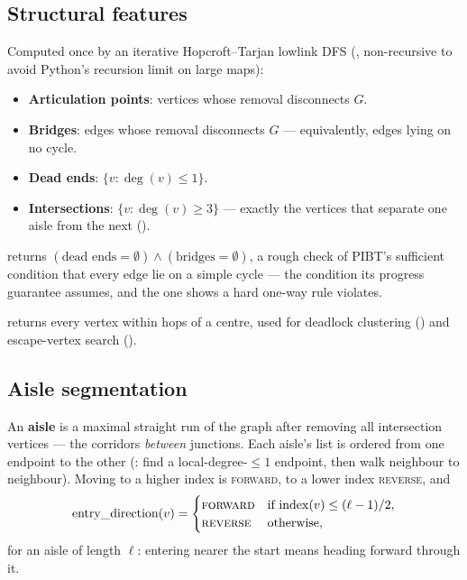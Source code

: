 \subsection{Structural features}
\label{sec:graph-structure}

Computed once by an iterative Hopcroft--Tarjan lowlink DFS
(, non-recursive to avoid Python's
recursion limit on large maps):

\begin{itemize}
\item \textbf{Articulation points}: vertices whose removal disconnects $G$.
\item \textbf{Bridges}: edges whose removal disconnects $G$ --- equivalently,
  edges lying on no cycle.
\item \textbf{Dead ends}: $\{v : \deg(v) \leq 1\}$.
\item \textbf{Intersections}: $\{v : \deg(v) \geq 3\}$ --- exactly the vertices
  that separate one aisle from the next ().
\end{itemize}

 returns
$(\text{dead ends} = \emptyset) \wedge (\text{bridges} = \emptyset)$, a rough
check of PIBT's sufficient condition that every edge lie on a simple cycle ---
the condition its progress guarantee assumes, and the one
 shows a hard one-way rule violates.

 returns every vertex within  hops
of a centre, used for deadlock clustering () and
escape-vertex search ().

\subsection{Aisle segmentation}
\label{sec:graph-aisles}

An \textbf{aisle} is a maximal straight run of the graph after removing all
intersection vertices --- the corridors \emph{between} junctions. Each aisle's
 list is ordered from one endpoint to the other
(: find a local-degree-$\leq 1$ endpoint, then walk
neighbour to neighbour). Moving to a higher index is \textsc{forward}, to a
lower index \textsc{reverse}, and
\begin{equation}
  \mathrm{entry\_direction}(v) =
  \begin{cases}
    \textsc{forward} & \text{if } \mathrm{index}(v) \leq (\ell - 1)/2,\\
    \textsc{reverse} & \text{otherwise,}
  \end{cases}
\end{equation}
for an aisle of length $\ell$: entering nearer the start means heading forward
through it.

